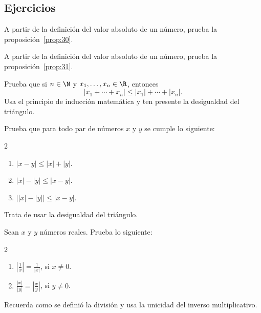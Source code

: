 \documentclass[12pt,a4paper]{book}
\begin{document}
    \par{}\subsection*{Ejercicios}

    \begin{ejercicio}\label{ej:129}
        A partir de la definición del valor absoluto de un número,
        prueba la proposición~\ref{prop:30}.
    \end{ejercicio}

    \begin{ejercicio}\label{ej:130}
        A partir de la definición del valor absoluto de un número,
        prueba la proposición~\ref{prop:31}.
    \end{ejercicio}

    \begin{ejercicio}\label{ej:131}
        Prueba que si
        $n\in\N$ y $x_{1},\ldots,x_{n}\in\R$, entonces
        \begin{equation*}
            |x_{1}+\cdots+x_{n}|\leq|x_{1}|+\cdots+|x_{n}|.
        \end{equation*}
        \sugerencia Usa el principio de inducción matemática y ten presente la
        desigualdad del triángulo.
    \end{ejercicio}

    \begin{ejercicio}\label{ej:132}
        Prueba que para todo par de números $x$ y $y$ se cumple lo
        siguiente:
        \begin{multicols}{2}
        \begin{enumerate}[nosep]
            \item $|x-y|\leq|x|+|y|$.
            \item $|x|-|y|\leq|x-y|$.
            \item $\big||x|-|y|\big|\leq|x-y|$.
        \end{enumerate}
        \end{multicols}
        \sugerencia Trata de usar la desigualdad del triángulo.
    \end{ejercicio}

    \begin{ejercicio}\label{ej:133}
        Sean $x$ y $y$ números reales. Prueba lo siguiente:
        \begin{multicols}{2}
        \begin{enumerate}[nosep]
            \item $\left|\frac{1}{x}\right|=\frac{1}{|x|}$, si $x\neq 0$.
            \item $\frac{|x|}{|y|}=\left|\frac{x}{y}\right|$, si $y\neq 0$.
        \end{enumerate}
        \end{multicols}
        \sugerencia Recuerda como se definió la división y usa la unicidad del
        inverso multiplicativo.
    \end{ejercicio}
\end{document}
